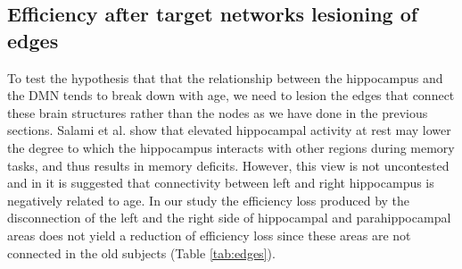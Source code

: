 \documentclass[12pt,a4paper]{article}
\begin{document}
\subsection{Efficiency after target networks lesioning of edges}
\label{ss:edges}
To test the hypothesis that that the relationship between the hippocampus and the DMN tends to break down with age, we need to lesion the edges that connect these brain structures rather than the nodes as we have done in the previous sections. 
Salami et al. show that \citep{salami_elevated_2014} elevated hippocampal activity at rest may lower the degree to which the hippocampus interacts with other regions during memory tasks, and thus results in memory deficits. However, this view is not uncontested and in \citep{Damoiseaux_2015} it is suggested that connectivity between left and right hippocampus is negatively related to age.
In our study the efficiency loss produced by the disconnection of the left and the right side of hippocampal and parahippocampal areas does not yield a reduction of efficiency loss since these areas are not connected in the old subjects (Table \ref{tab:edges}). 
\end{document}
